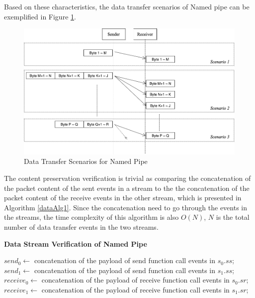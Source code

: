 Based on these characteristics, the data transfer scenarios of Named pipe can be exemplified in Figure \ref{namedpipe}. 
\begin{figure}[H]
\centerline{\includegraphics[scale=0.4]{Figures/namedpipe}}
\caption{Data Transfer Scenarios for Named Pipe}
\label{namedpipe}
\end{figure}

The content preservation verification is trivial as comparing the concatenation of the packet content of the sent events in a stream to the the concatenation of the packet content of the receive events in the other stream, which is presented in Algorithm \ref{dataAlg1}. Since the concatenation need to go through the events in the streams, the time complexity of this algorithm is also $O(N)$, $N$ is the total number of data transfer events in the two streams.

\begin{algorithm}[H]
\DontPrintSemicolon
\caption{{\bf Data Stream Verification of Named Pipe} \label{dataAlg1}}
\;
$send_0 \leftarrow$ concatenation of the payload of send function call events in $s_0.ss$;\;
$send_1 \leftarrow$ concatenation of the payload of send function call events in $s_1.ss$;\;
$receive_0 \leftarrow$ concatenation of the payload of receive function call events in $s_0.sr$;\;
$receive_1 \leftarrow$ concatenation of the payload of receive function call events in $s_1.sr$;\;
\end{algorithm} 

